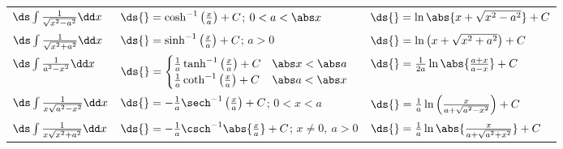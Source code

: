 {
\addtolength{\tabcolsep}{-.2em}
\begin{keyidea}\label{idea:hyperbolic_inverse_integrals}
%
\begin{anywhereenum}
\renewcommand{\arraystretch}{2.5}
\begin{tabular}{lll}
\item $\ds\int\frac1{\sqrt{x^2-a^2}}\dd x$ & $\ds{}=\cosh^{-1}\left(\frac xa\right)+C$; $0<a<\abs x$ & $\ds{}=\ln\abs{x+\sqrt{x^2-a^2}}+C$ \\
\item $\ds\int\frac1{\sqrt{x^2+a^2}}\dd x$ & $\ds{}=\sinh^{-1}\left(\frac xa\right)+C$; $a>0$ & $\ds{}=\ln\left(x+\sqrt{x^2+a^2}\right)+C$ \\
\item $\ds\int\frac1{a^2-x^2}\dd x$ & $\ds{}=\begin{cases}
\frac1a\tanh^{-1}\left(\frac xa\right)+C & \abs x<\abs a \\
\frac1a\coth^{-1}\left(\frac xa\right)+C & \abs a<\abs x
\end{cases}$ & $\ds{}=\frac1{2a}\ln\abs{\frac{a+x}{a-x}}+C$ \\
\item $\ds\int\frac1{x\sqrt{a^2-x^2}}\dd x$ & $\ds{}=-\frac1a\sech^{-1}\left(\frac xa\right)+C$; $0<x<a$ & $\ds{}=\frac1a\ln\left(\frac{x}{a+\sqrt{a^2-x^2}}\right)+C$ \\
\item $\ds\int\frac1{x\sqrt{x^2+a^2}}\dd x$ & $\ds{}=-\frac1a\csch^{-1}\abs{\frac xa}+C$; $x\neq 0,\ a>0$ & $\ds{}=\frac1a\ln\abs{\frac{x}{a+\sqrt{a^2+x^2}}}+C$\\
\end{tabular}
\end{anywhereenum}
\end{keyidea}}

